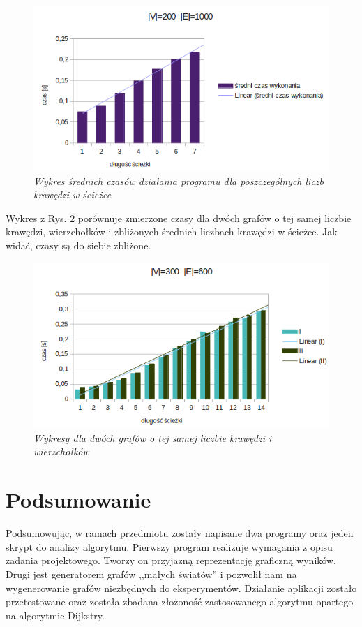 \documentclass[a4paper, 12pt]{article}
\begin{document}
\begin{figure}[!htb]
\centering
\includegraphics[scale=0.6]{tests/6/wykres.PNG}
\caption{\em Wykres średnich czasów działania programu dla poszczególnych liczb krawędzi w ścieżce}
\label{fig:wykres200V1000E}
\end{figure}

Wykres z Rys. \ref{fig:wykres-porownanie} porównuje zmierzone czasy dla dwóch grafów o tej samej liczbie krawędzi, wierzchołków i zbliżonych średnich liczbach krawędzi w ścieżce. Jak widać, czasy są do siebie zbliżone.

\begin{figure}[!htb]
\centering
\includegraphics[scale=0.6]{tests/4/wykres.PNG}
\caption{\em Wykresy dla dwóch grafów o tej samej liczbie krawędzi i wierzchołków}
\label{fig:wykres-porownanie}
\end{figure}

\section{Podsumowanie}

Podsumowując, w ramach przedmiotu zostały napisane dwa programy oraz jeden skrypt do analizy algorytmu. Pierwszy program realizuje wymagania z opisu zadania projektowego. Tworzy on przyjazną reprezentację graficzną wyników. Drugi jest generatorem grafów ,,małych światów'' i pozwolił nam na wygenerowanie grafów niezbędnych do eksperymentów. Działanie aplikacji zostało przetestowane oraz została zbadana złożoność zastosowanego algorytmu opartego na algorytmie Dijkstry.
\end{document}
